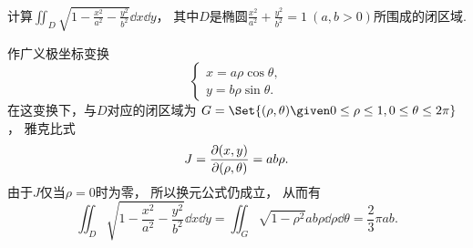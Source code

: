 \begin{example}
计算\(\iint_D \sqrt{1 - \frac{x^2}{a^2} - \frac{y^2}{b^2}} \dd{x} \dd{y}\)，
其中\(D\)是椭圆\(\frac{x^2}{a^2} + \frac{y^2}{b^2} = 1\ (a,b>0)\)所围成的闭区域.
\begin{solution}
作广义极坐标变换\[
	\left\{ \begin{array}{l}
		x = a \rho \cos\theta, \\
		y = b \rho \sin\theta.
	\end{array} \right.
\]
在这变换下，与\(D\)对应的闭区域为
\(G = \Set{(\rho,\theta) \given 0\leq\rho\leq1,0\leq\theta\leq2\pi}\)，
雅克比式\[
	J = \pdv{ (x,y) }{ (\rho,\theta) } = ab\rho.
\]
由于\(J\)仅当\(\rho=0\)时为零，
所以换元公式仍成立，
从而有\[
	\iint_D \sqrt{1 - \frac{x^2}{a^2} - \frac{y^2}{b^2}} \dd{x} \dd{y}
	= \iint_G \sqrt{1-\rho^2} ab\rho \dd{\rho} \dd{\theta}
	= \frac23 \pi ab.
\]
\end{solution}
\end{example}
